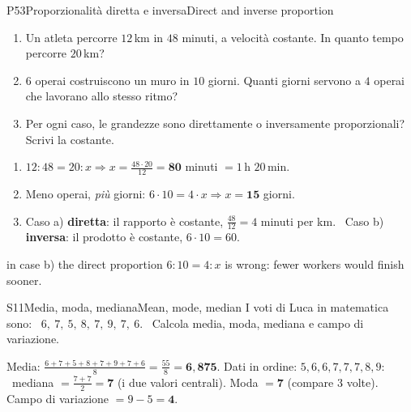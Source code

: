 \begin{esercizio}{P5}{3}{Proporzionalità diretta e inversa}{Direct and inverse proportion}
\begin{enumerate}
\item Un atleta percorre $12$\,km in $48$ minuti, a velocità costante. In quanto tempo percorre $20$\,km?
\item $6$ operai costruiscono un muro in $10$ giorni. Quanti giorni servono a $4$ operai che lavorano allo stesso ritmo?
\item Per ogni caso, le grandezze sono direttamente o inversamente proporzionali? Scrivi la costante.
\end{enumerate}
\end{esercizio}
\begin{solbox}
\begin{enumerate}
\item $12:48=20:x\Rightarrow x=\frac{48\cdot20}{12}=\mathbf{80}$ minuti $=1$\,h $20$\,min.
\item Meno operai, \emph{più} giorni: $6\cdot10=4\cdot x\Rightarrow x=\mathbf{15}$ giorni.
\item Caso a) \textbf{diretta}: il rapporto è costante, $\frac{48}{12}=4$ minuti per km. \ Caso b) \textbf{inversa}: il prodotto è costante, $6\cdot10=60$.
\end{enumerate}
{in case b) the direct proportion $6:10=4:x$ is wrong: fewer workers would finish sooner.}
\end{solbox}


\begin{esercizio}{S1}{1}{Media, moda, mediana}{Mean, mode, median}
I voti di Luca in matematica sono: \ $6,\ 7,\ 5,\ 8,\ 7,\ 9,\ 7,\ 6$. \ Calcola media, moda, mediana e campo di variazione.
\end{esercizio}
\begin{solbox}
Media: $\frac{6+7+5+8+7+9+7+6}{8}=\frac{55}{8}=\mathbf{6,875}$.\quad
Dati in ordine: $5,6,6,7,7,7,8,9$: \ mediana $=\frac{7+7}{2}=\mathbf{7}$ (i due valori centrali).\quad
Moda $=\mathbf{7}$ (compare 3 volte).\quad
Campo di variazione $=9-5=\mathbf{4}$.
\end{solbox}


